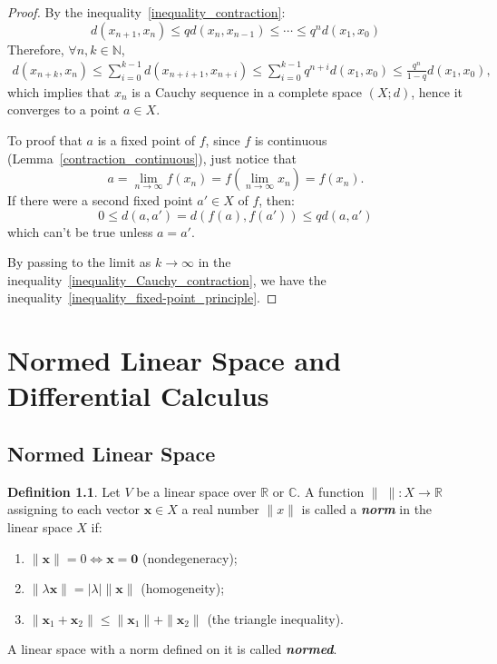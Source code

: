 \documentclass[openany]{book}
\newcommand*{\indexbf}[1]{\emph{\textbf{#1}}\index{#1}} %
\theoremstyle{plain}
\theoremstyle{definition}
\newtheorem{definition}{Definition}[section] %
\begin{document}
\begin{proof}
By the inequality~\ref{inequality_contraction}:
\[
d ( x_{n+1}, x_n) \leq q d( x_n, x_{n-1})
\leq \cdots 
\leq q^n d( x_1, x_0)
\]
Therefore, $\forall n, k \in \mathbb{N}$, 
\begin{align}\label{inequality_Cauchy_contraction}
	d ( x_{n+k}, x_n) \leq 
	\sum^{k-1}_{i=0} d( x_{n+i+1}, x_{n+i}) \leq
	\sum^{k-1}_{i=0} q^{n+i} d( x_1, x_0) \leq
	\frac{q^n}{1-q} d( x_1, x_0),
\end{align}
which implies that ${ x_n}$ is a Cauchy sequence in a complete space $(X;d)$, hence it converges to a point $a \in X$.

To proof that $a$ is a fixed point of $f$, since $f$ is continuous (Lemma~\ref{contraction_continuous}), just notice that 
\[
	a = \lim_{n\to \infty} f(x_n) = 
	f( \lim_{n\to \infty} x_n) = f( x_n).
\]
If there were a second fixed point $a'\in X$ of $f$, then:
\[
	0 \leq d( a, a')  = d( f(a), f(a') ) \leq q d( a, a')
\]
which can't be true unless $a = a'$. 

By passing to the limit as $k \to \infty$ in the inequality~\ref{inequality_Cauchy_contraction}, we have the inequality~\ref{inequality_fixed-point_principle}.
\end{proof}

\chapter{Normed Linear Space and Differential Calculus}
\section{Normed Linear Space}
\begin{definition}
Let $V$ be a linear space over $\mathbb{R}$ or $\mathbb{C}$. A function $\|\;\|: X\to \mathbb{R}$ assigning to each vector $\boldsymbol{x}\in X$ a real number $\|x\|$ is called a \indexbf{norm} in the linear space $X$ if:
\begin{enumerate}[label=\alph*)]
	\item 
	$\|\boldsymbol{x}\|=0\Leftrightarrow \boldsymbol{x}=\boldsymbol{0}$ (nondegeneracy);
	\item
	$\|\lambda \boldsymbol{x}\| = |\lambda|\|\boldsymbol{x}\|$ (homogeneity);
	\item
	$\|\boldsymbol{x}_1+\boldsymbol{x}_2\|\leq 
	\|\boldsymbol{x}_1\|+\|\boldsymbol{x}_2\|$ (the triangle inequality).
\end{enumerate}	
A linear space with a norm defined on it is called \indexbf{normed}.
\end{definition}

\backmatter
\nocite{*} %
\printbibliography[heading=bibliography, title={Bibliography}]


\printindex
\end{document}

